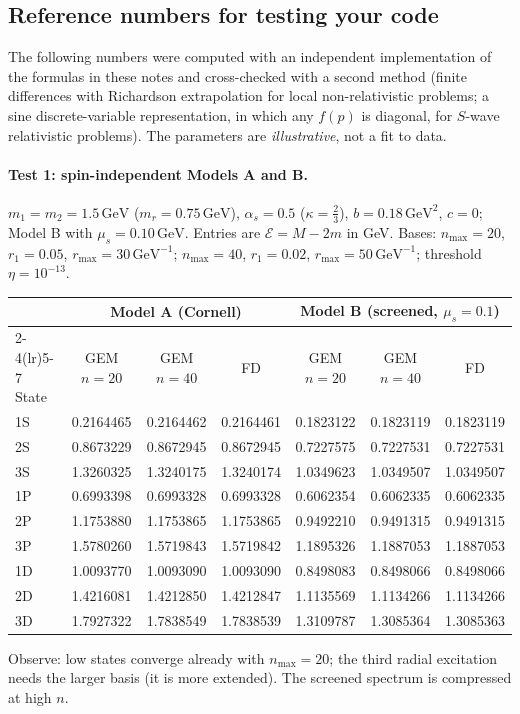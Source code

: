 \documentclass[11pt,a4paper]{article}
\numberwithin{equation}{section}
\theoremstyle{definition}
\theoremstyle{plain}
\theoremstyle{remark}
\numberwithin{algorithm}{section}
\newcommand{\as}{\alpha_s}
\newcommand{\mr}{m_r}
\newcommand{\mus}{\mu_s}
\newcommand{\GeV}{\,\mathrm{GeV}}
\begin{document}
\subsection{Reference numbers for testing your code}\label{sec:refnum}
The following numbers were computed with an independent implementation of the formulas in these notes and cross-checked with a second method (finite differences with Richardson extrapolation for local non-relativistic problems; a sine discrete-variable representation, in which any $f(p)$ is diagonal, for $S$-wave relativistic problems). The parameters are \emph{illustrative}, not a fit to data.

\paragraph{Test 1: spin-independent Models A and B.} $m_1=m_2=1.5\GeV$ ($\mr=0.75\GeV$), $\as=0.5$ ($\kappa=\frac23$), $b=0.18\GeV^2$, $c=0$; Model B with $\mus=0.10\GeV$. Entries are $\mathcal E=M-2m$ in GeV. Bases: $n_{\max}=20$, $r_1=0.05$, $r_{\max}=30\GeV^{-1}$; $n_{\max}=40$, $r_1=0.02$, $r_{\max}=50\GeV^{-1}$; threshold $\eta=10^{-13}$.
\begin{center}\small
\begin{tabular}{@{}lccc@{\hspace{1.2em}}ccc@{}}
\toprule
 & \multicolumn{3}{c}{Model A (Cornell)} & \multicolumn{3}{c}{Model B (screened, $\mus=0.1$)}\\
 \cmidrule(lr){2-4}\cmidrule(lr){5-7}
State & GEM $n=20$ & GEM $n=40$ & FD & GEM $n=20$ & GEM $n=40$ & FD\\\midrule
1S & 0.2164465 & 0.2164462 & 0.2164461 & 0.1823122 & 0.1823119 & 0.1823119\\
2S & 0.8673229 & 0.8672945 & 0.8672945 & 0.7227575 & 0.7227531 & 0.7227531\\
3S & 1.3260325 & 1.3240175 & 1.3240174 & 1.0349623 & 1.0349507 & 1.0349507\\
1P & 0.6993398 & 0.6993328 & 0.6993328 & 0.6062354 & 0.6062335 & 0.6062335\\
2P & 1.1753880 & 1.1753865 & 1.1753865 & 0.9492210 & 0.9491315 & 0.9491315\\
3P & 1.5780260 & 1.5719843 & 1.5719842 & 1.1895326 & 1.1887053 & 1.1887053\\
1D & 1.0093770 & 1.0093090 & 1.0093090 & 0.8498083 & 0.8498066 & 0.8498066\\
2D & 1.4216081 & 1.4212850 & 1.4212847 & 1.1135569 & 1.1134266 & 1.1134266\\
3D & 1.7927322 & 1.7838549 & 1.7838539 & 1.3109787 & 1.3085364 & 1.3085363\\\bottomrule
\end{tabular}
\end{center}
Observe: low states converge already with $n_{\max}=20$; the third radial excitation needs the larger basis (it is more extended). The screened spectrum is compressed at high $n$.
\end{document}
